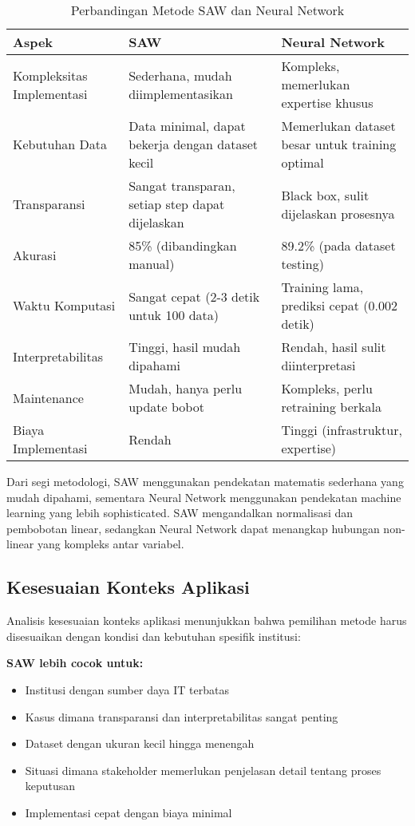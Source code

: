 \documentclass[10pt,a4paper]{article}
\begin{document}
\begin{table}[h]
\centering
\caption{Perbandingan Metode SAW dan Neural Network}
\label{tab:comparison}
\begin{tabular}{|p{3cm}|p{5.5cm}|p{5.5cm}|}
\hline
\textbf{Aspek} & \textbf{SAW} & \textbf{Neural Network} \\
\hline
Kompleksitas Implementasi & Sederhana, mudah diimplementasikan & Kompleks, memerlukan expertise khusus \\
\hline
Kebutuhan Data & Data minimal, dapat bekerja dengan dataset kecil & Memerlukan dataset besar untuk training optimal \\
\hline
Transparansi & Sangat transparan, setiap step dapat dijelaskan & Black box, sulit dijelaskan prosesnya \\
\hline
Akurasi & 85\% (dibandingkan manual) & 89.2\% (pada dataset testing) \\
\hline
Waktu Komputasi & Sangat cepat (2-3 detik untuk 100 data) & Training lama, prediksi cepat (0.002 detik) \\
\hline
Interpretabilitas & Tinggi, hasil mudah dipahami & Rendah, hasil sulit diinterpretasi \\
\hline
Maintenance & Mudah, hanya perlu update bobot & Kompleks, perlu retraining berkala \\
\hline
Biaya Implementasi & Rendah & Tinggi (infrastruktur, expertise) \\
\hline
\end{tabular}
\end{table}

Dari segi metodologi, SAW menggunakan pendekatan matematis sederhana yang mudah dipahami, sementara Neural Network menggunakan pendekatan machine learning yang lebih sophisticated. SAW mengandalkan normalisasi dan pembobotan linear, sedangkan Neural Network dapat menangkap hubungan non-linear yang kompleks antar variabel.

\subsection{Kesesuaian Konteks Aplikasi}

Analisis kesesuaian konteks aplikasi menunjukkan bahwa pemilihan metode harus disesuaikan dengan kondisi dan kebutuhan spesifik institusi:

\textbf{SAW lebih cocok untuk:}
\begin{itemize}
    \item Institusi dengan sumber daya IT terbatas
    \item Kasus dimana transparansi dan interpretabilitas sangat penting
    \item Dataset dengan ukuran kecil hingga menengah
    \item Situasi dimana stakeholder memerlukan penjelasan detail tentang proses keputusan
    \item Implementasi cepat dengan biaya minimal
\end{itemize}
\end{document}
